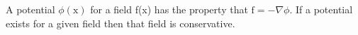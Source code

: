 A potential $ \phi ( \mathrm{x} ) $ for a field f(x) has the property that
$ \mathrm{f} = - \nabla \phi . $ If a potential exists for a given field
then that field is conservative.